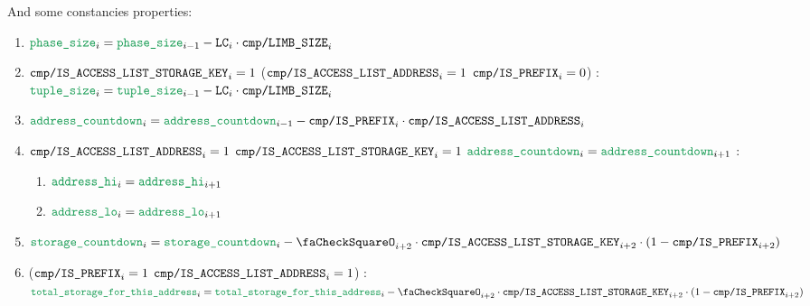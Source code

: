 \begin{enumerate}[resume]
		And some constancies properties:
		\begin{enumerate}
			\item $\locPhaseSize _{i} = \locPhaseSize _{i - 1} - \lc _{i} \cdot \rlpTxnComputationColumnLimbSize _{i}$
			\item \If $\texttt{cmp}\texttt{/}\texttt{{IS\_ACCESS\_LIST\_STORAGE\_KEY}} _{i} =1$ \Or ($\texttt{cmp}\texttt{/}\texttt{{IS\_ACCESS\_LIST\_ADDRESS}} _{i} =1$ \et $\texttt{cmp}\texttt{/}\texttt{{\texttt{IS\_PREFIX}}} _{i} =0$) \Then: $\locAccessListTupleSize _{i} = \locAccessListTupleSize _{i - 1} - \lc _{i} \cdot \rlpTxnComputationColumnLimbSize _{i}$
			\item $\locAddressPrewarmingCountdown _{i} = \locAddressPrewarmingCountdown _{i - 1} - \rlpTxnComputationColumnIsPrefix _{i} \cdot \rlpTxnComputationColumnIsAccessListAddress _{i}$
			\item \If $\texttt{cmp}\texttt{/}\texttt{{IS\_ACCESS\_LIST\_ADDRESS}} _{i} =1$ \et $\texttt{cmp}\texttt{/}\texttt{{IS\_ACCESS\_LIST\_STORAGE\_KEY}} _{i}=1$ \et $\locAddressPrewarmingCountdown _{i} = \locAddressPrewarmingCountdown _{i + 1}$ \Then:
				\begin{enumerate}
					\item $\locAddressHi _{i} = \locAddressHi _{i + 1}$
					\item $\locAddressLo _{i} = \locAddressLo _{i + 1}$
				\end{enumerate}
			\item $\locStoragePrewarmingCountdown _{i} = \locStoragePrewarmingCountdown _{i} - \done _{i + 2} \cdot \rlpTxnComputationColumnIsAccessListStorageKey _{i + 2} \cdot (1 - \rlpTxnComputationColumnIsPrefix _{i + 2})$
			\item \If ($\texttt{cmp}\texttt{/}\texttt{{\texttt{IS\_PREFIX}}} _{i} =1$ \et $\texttt{cmp}\texttt{/}\texttt{{IS\_ACCESS\_LIST\_ADDRESS}} _{i} =1$) \Then: $\locTotStorageForThisAddress _{i} = \locTotStorageForThisAddress _{i} - \done _{i + 2} \cdot \rlpTxnComputationColumnIsAccessListStorageKey _{i + 2} \cdot (1 - \rlpTxnComputationColumnIsPrefix _{i + 2})$
		\end{enumerate}
	\end{enumerate}

